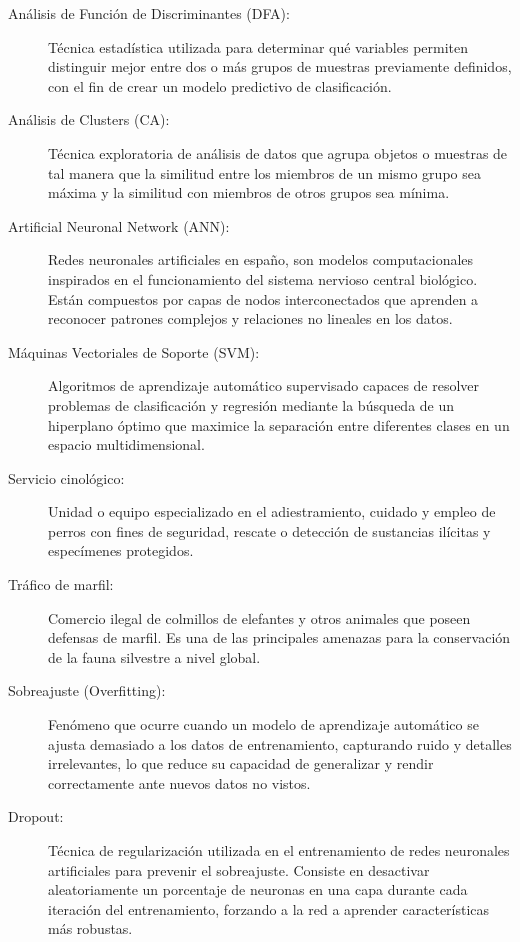 \documentclass[hidelinks, headlogo, framedcover]{tfeEPCC}
\begin{document}
\begin{description}
    \item[Análisis de Función de Discriminantes (DFA):] Técnica estadística utilizada para determinar qué variables permiten distinguir mejor entre dos o más grupos de muestras previamente definidos, con el fin de crear un modelo predictivo de clasificación.
    
    \item[Análisis de Clusters (CA):] Técnica exploratoria de análisis de datos que agrupa objetos o muestras de tal manera que la similitud entre los miembros de un mismo grupo sea máxima y la similitud con miembros de otros grupos sea mínima.
    
    \item[Artificial Neuronal Network (ANN):] Redes neuronales artificiales en españo, son modelos computacionales inspirados en el funcionamiento del sistema nervioso central biológico. Están compuestos por capas de nodos interconectados que aprenden a reconocer patrones complejos y relaciones no lineales en los datos.
    
    \item[Máquinas Vectoriales de Soporte (SVM):] Algoritmos de aprendizaje automático supervisado capaces de resolver problemas de clasificación y regresión mediante la búsqueda de un hiperplano óptimo que maximice la separación entre diferentes clases en un espacio multidimensional.
    
    \item[Servicio cinológico:] Unidad o equipo especializado en el adiestramiento, cuidado y empleo de perros con fines de seguridad, rescate o detección de sustancias ilícitas y especímenes protegidos.
    
    \item[Tráfico de marfil:] Comercio ilegal de colmillos de elefantes y otros animales que poseen defensas de marfil. Es una de las principales amenazas para la conservación de la fauna silvestre a nivel global.
    
    \item[Sobreajuste (Overfitting):] Fenómeno que ocurre cuando un modelo de aprendizaje automático se ajusta demasiado a los datos de entrenamiento, capturando ruido y detalles irrelevantes, lo que reduce su capacidad de generalizar y rendir correctamente ante nuevos datos no vistos.

    \item[Dropout:] Técnica de regularización utilizada en el entrenamiento de redes neuronales artificiales para prevenir el sobreajuste. Consiste en desactivar aleatoriamente un porcentaje de neuronas en una capa durante cada iteración del entrenamiento, forzando a la red a aprender características más robustas.
    

\end{description}
\end{document}
